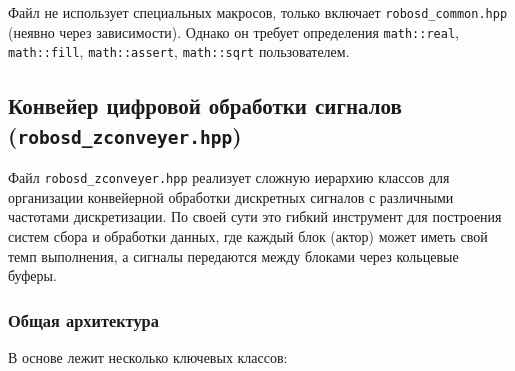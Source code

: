 \documentclass[a4paper,12pt]{article}
\begin{document}
Файл не использует специальных макросов, только включает \texttt{robosd\_common.hpp} (неявно через зависимости). Однако он требует определения \texttt{math::real}, \texttt{math::fill}, \texttt{math::assert}, \texttt{math::sqrt} пользователем.

\subsection{Конвейер цифровой обработки сигналов (\texttt{robosd\_zconveyer.hpp})}

Файл \texttt{robosd\_zconveyer.hpp} реализует сложную иерархию классов для организации конвейерной обработки дискретных сигналов с различными частотами дискретизации. По своей сути это гибкий инструмент для построения систем сбора и обработки данных, где каждый блок (актор) может иметь свой темп выполнения, а сигналы передаются между блоками через кольцевые буферы.

\subsubsection{Общая архитектура}

В основе лежит несколько ключевых классов:
\end{document}
